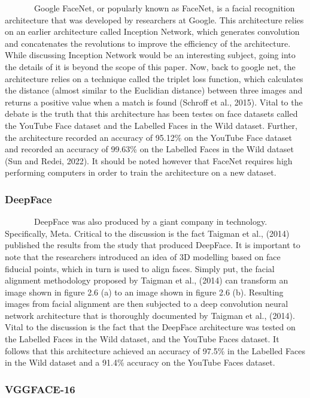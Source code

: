 \documentclass[
  12pt,
]{article}
\begin{document}
~~~~~~~Google FaceNet, or popularly known as FaceNet, is a facial
recognition architecture that was developed by researchers at Google.
This architecture relies on an earlier architecture called Inception
Network, which generates convolution and concatenates the revolutions to
improve the efficiency of the architecture. While discussing Inception
Network would be an interesting subject, going into the details of it is
beyond the scope of this paper. Now, back to google net, the
architecture relies on a technique called the triplet loss function,
which calculates the distance (almost similar to the Euclidian distance)
between three images and returns a positive value when a match is found
(Schroff et al., 2015). Vital to the debate is the truth that this
architecture has been testes on face datasets called the YouTube Face
dataset and the Labelled Faces in the Wild dataset. Further, the
architecture recorded an accuracy of 95.12\% on the YouTube Face dataset
and recorded an accuracy of 99.63\% on the Labelled Faces in the Wild
dataset (Sun and Redei, 2022). It should be noted however that FaceNet
requires high performing computers in order to train the architecture on
a new dataset.

\subsubsection{DeepFace}\label{deepface}

~~~~~~~DeepFace was also produced by a giant company in technology.
Specifically, Meta. Critical to the discussion is the fact Taigman et
al., (2014) published the results from the study that produced DeepFace.
It is important to note that the researchers introduced an idea of 3D
modelling based on face fiducial points, which in turn is used to align
faces. Simply put, the facial alignment methodology proposed by Taigman
et al., (2014) can transform an image shown in figure 2.6 (a) to an
image shown in figure 2.6 (b). Resulting images from facial alignment
are then subjected to a deep convolution neural network architecture
that is thoroughly documented by Taigman et al., (2014). Vital to the
discussion is the fact that the DeepFace architecture was tested on the
Labelled Faces in the Wild dataset, and the YouTube Faces dataset. It
follows that this architecture achieved an accuracy of 97.5\% in the
Labelled Faces in the Wild dataset and a 91.4\% accuracy on the YouTube
Faces dataset.

\subsubsection{VGGFACE-16}\label{vggface-16}
\end{document}
